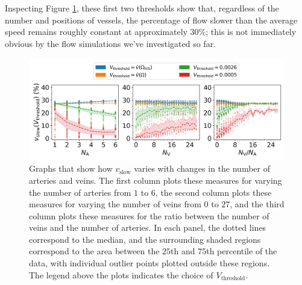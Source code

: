             Inspecting Figure \ref{fig:mega-vessels2}, these first two thresholds show that, regardless of the number and positions of vessels, the percentage of flow slower than the average speed remains roughly constant at approximately $30\%$; this is not immediately obvious by the flow simulations we've investigated so far.

            \begin{figure}
                \centering
                \includegraphics[width=\textwidth]{diagrams/results-variations/mega2_no-arteries_no-veins_veins-to-arteries.png}
                \caption{Graphs that show how $v_\text{slow}$ varies with changes in the number of arteries and veins. The first column plots these measures for varying the number of arteries from $1$ to $6$, the second column plots these measures for varying the number of veins from $0$ to $27$, and the third column plots these measures for the ratio between the number of veins and the number of arteries. In each panel, the dotted lines correspond to the median, and the surrounding shaded regions correspond to the area between the $25$th and $75$th percentile of the data, with individual outlier points plotted outside these regions. The legend above the plots indicates the choice of $V_\text{threshold}$.}
                \label{fig:mega-vessels2}
            \end{figure}
            
